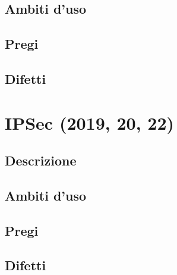 \documentclass[10pt,oneside,a4paper]{article}
\begin{document}
\subsection{Ambiti d'uso}
\subsection{Pregi}
\subsection{Difetti}
\section{IPSec (2019, 20, 22)}
\subsection{Descrizione}
\subsection{Ambiti d'uso}
\subsection{Pregi}
\subsection{Difetti}
\end{document}
